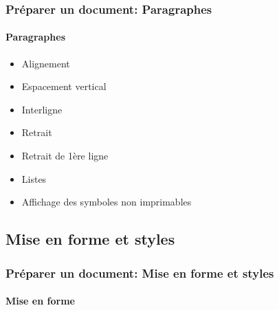 \documentclass[xcolor=table]{beamer}
\begin{document}
\begin{frame}
\frametitle{Préparer un document: Paragraphes}
\framesubtitle{Paragraphes}

\begin{minipage}{0.38\textwidth}
\begin{itemize}
	\item Alignement 
	\item Espacement vertical
	\item Interligne
	\item Retrait
	\item Retrait de 1ère ligne
	\item Listes
	\item Affichage des symboles non imprimables
\end{itemize}
\end{minipage}
\begin{minipage}{0.60\textwidth}

\end{minipage}

\end{frame}



\subsection{Mise en forme et styles}

\begin{frame}
\frametitle{Préparer un document: Mise en forme et styles}
\framesubtitle{Mise en forme}

\begin{minipage}{0.48\textwidth}
\end{minipage}
\begin{minipage}{0.50\textwidth}
%
\end{minipage}

\end{frame}
\end{document}
